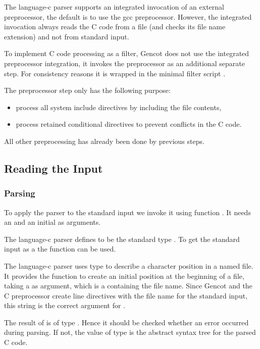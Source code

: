 The language-c parser supports an integrated invocation of an external preprocessor, the default is to use
the gcc preprocessor. However, the integrated invocation always reads the C code from a file (and checks
its file name extension) and not from standard input.

To implement C code processing as a filter, Gencot does not use the integrated preprocessor integration,
it invokes the preprocessor as an additional separate step. For consistency reasons it is wrapped in
the minimal filter script . 

The preprocessor step only has the following purpose:
\begin{itemize}
\item process all system include directives by including the file contents,
\item process retained conditional directives to prevent conflicts in the C code.
\end{itemize}
All other preprocessing has already been done by previous steps.

\subsection{Reading the Input}

\subsubsection{Parsing}

To apply the parser to the standard input we invoke it using function . It needs an 
and an initial  as arguments. 

The language-c parser defines  to be the standard type . To get the 
standard input as a  the function  can be used. 

The language-c parser uses type  to describe a character position in a named file. It provides
the function  to create an initial position at the beginning of a file, taking a 
as argument, which is a  containing the file name. Since Gencot and the C preprocessor create
line directives with the file name  for the standard input, this string is the correct argument
for . 

The result of  is of type . Hence it should be checked whether
an error occurred during parsing. If not, the value of type  is the abstract syntax tree for
the parsed C code.

